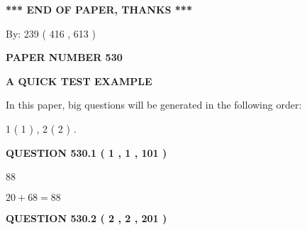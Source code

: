 \documentclass[12pt]{article}
\begin{document}
   
   
   
   
\vspace{1.0in} 
{\textbf{\large{ *** END OF PAPER, THANKS *** }}} 
   
   
\hspace{1.0in} By: 
 239 ( 416 ,  613 )
   
   
   
   
\newpage 
\setcounter{page}{ 
   530001 } 
   
   
   
   
 {\textbf{ \Large{ PAPER NUMBER  530  }}}
   
   
\vspace{0.2in}
   
   
   
   
   
   
 \vspace{0.2in}
{\LARGE {\textbf{ A QUICK TEST EXAMPLE}}}
   
   
   
\vspace{0.2in}
   
In this paper, big questions will be generated in the following order: 
   
   
   1 ( 1 )
 ,
   2 ( 2 )
 .
  
\vspace{0.2in}
  
{\textbf{\Large{QUESTION
530.1 
 ( 1 , 1 , 101 )
}}}
  
  
 
 
\noindent{}

88
 
 
 
 
\noindent{}

$ %
20 +  %
68=   %
88$
 
 
  
\vspace{0.2in}
  
{\textbf{\Large{QUESTION
530.2 
 ( 2 , 2 , 201 )
}}}
  
  
 
 
\noindent{}
 
\end{document}
